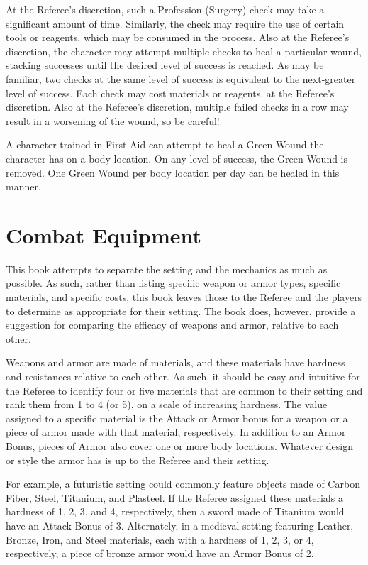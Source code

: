 \documentclass[oneside]{book}
\begin{document}
\begin{multicols}{2}
At the Referee's discretion, such a Profession (Surgery) check may take a significant amount of time. Similarly, the check may require the use of certain tools or reagents, which may be consumed in the process. Also at the Referee's discretion, the character may attempt multiple checks to heal a particular wound, stacking successes until the desired level of success is reached. As may be familiar, two checks at the same level of success is equivalent to the next-greater level of success. Each check may cost materials or reagents, at the Referee's discretion. Also at the Referee's discretion, multiple failed checks in a row may result in a worsening of the wound, so be careful!

A character trained in First Aid can attempt to heal a Green Wound the character has on a body location. On any level of success, the Green Wound is removed. One Green Wound per body location per day can be healed in this manner.

\section{Combat Equipment}
This book attempts to separate the setting and the mechanics as much as possible. As such, rather than listing specific weapon or armor types, specific materials, and specific costs, this book leaves those to the Referee and the players to determine as appropriate for their setting. The book does, however, provide a suggestion for comparing the efficacy of weapons and armor, relative to each other. 

Weapons and armor are made of materials, and these materials have hardness and resistances relative to each other. As such, it should be easy and intuitive for the Referee to identify four or five materials that are common to their setting and rank them from 1 to 4 (or 5), on a scale of increasing hardness. The value assigned to a specific material is the Attack or Armor bonus for a weapon or a piece of armor made with that material, respectively. In addition to an Armor Bonus, pieces of Armor also cover one or more body locations. Whatever design or style the armor has is up to the Referee and their setting. 

For example, a futuristic setting could commonly feature objects made of Carbon Fiber, Steel, Titanium, and Plasteel. If the Referee assigned these materials a hardness of 1, 2, 3, and 4, respectively, then a sword made of Titanium would have an Attack Bonus of 3. Alternately, in a medieval setting featuring Leather, Bronze, Iron, and Steel materials, each with a hardness of 1, 2, 3, or 4, respectively, a piece of bronze armor would have an Armor Bonus of 2. 


\end{multicols}
\end{document}

